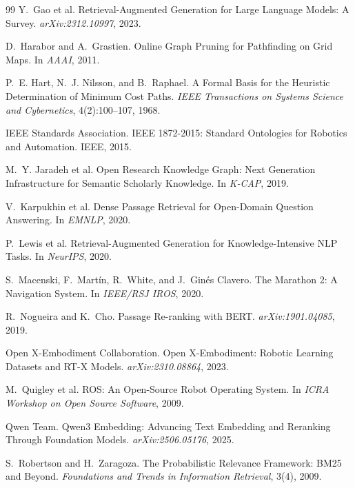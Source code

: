 \documentclass[10pt,a4paper]{article}
\begin{document}
\begin{thebibliography}{99}
Y.~Gao et al.
\newblock Retrieval-Augmented Generation for Large Language Models: A Survey.
\newblock \emph{arXiv:2312.10997}, 2023.

D.~Harabor and A.~Grastien.
\newblock Online Graph Pruning for Pathfinding on Grid Maps.
\newblock In \emph{AAAI}, 2011.

P.~E. Hart, N.~J. Nilsson, and B.~Raphael.
\newblock A Formal Basis for the Heuristic Determination of Minimum Cost Paths.
\newblock \emph{IEEE Transactions on Systems Science and Cybernetics},
  4(2):100--107, 1968.

IEEE Standards Association.
\newblock IEEE 1872-2015: Standard Ontologies for Robotics and Automation.
\newblock IEEE, 2015.

M.~Y. Jaradeh et al.
\newblock Open Research Knowledge Graph: Next Generation Infrastructure for
  Semantic Scholarly Knowledge.
\newblock In \emph{K-CAP}, 2019.

V.~Karpukhin et al.
\newblock Dense Passage Retrieval for Open-Domain Question Answering.
\newblock In \emph{EMNLP}, 2020.

P.~Lewis et al.
\newblock Retrieval-Augmented Generation for Knowledge-Intensive NLP Tasks.
\newblock In \emph{NeurIPS}, 2020.

S.~Macenski, F.~Mart{\'i}n, R.~White, and J.~Gin{\'e}s Clavero.
\newblock The Marathon 2: A Navigation System.
\newblock In \emph{IEEE/RSJ IROS}, 2020.

R.~Nogueira and K.~Cho.
\newblock Passage Re-ranking with BERT.
\newblock \emph{arXiv:1901.04085}, 2019.

Open X-Embodiment Collaboration.
\newblock Open X-Embodiment: Robotic Learning Datasets and RT-X Models.
\newblock \emph{arXiv:2310.08864}, 2023.

M.~Quigley et al.
\newblock ROS: An Open-Source Robot Operating System.
\newblock In \emph{ICRA Workshop on Open Source Software}, 2009.

Qwen Team.
\newblock Qwen3 Embedding: Advancing Text Embedding and Reranking Through
  Foundation Models.
\newblock \emph{arXiv:2506.05176}, 2025.

S.~Robertson and H.~Zaragoza.
\newblock The Probabilistic Relevance Framework: BM25 and Beyond.
\newblock \emph{Foundations and Trends in Information Retrieval}, 3(4), 2009.


\end{thebibliography}
\end{document}
